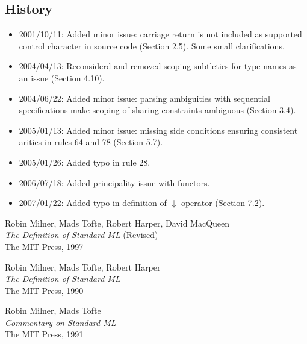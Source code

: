 \documentclass{article}
\begin{document}
\vfill
\pagebreak
\begin{appendix}

\section{History}
\label{history}

\begin{itemize} \setlength{\itemsep}{0em}
\item 2001/10/11: Added minor issue: carriage return is not included as supported control character in source code (Section 2.5). Some small clarifications.
\item 2004/04/13: Reconsiderd and removed scoping subtleties for type names as an issue (Section 4.10).
\item 2004/06/22: Added minor issue: parsing ambiguities with sequential specifications make scoping of sharing constraints ambiguous (Section 3.4).
\item 2005/01/13: Added minor issue: missing side conditions ensuring consistent arities in rules 64 and 78 (Section 5.7).
\item 2005/01/26: Added typo in rule 28.
\item 2006/07/18: Added principality issue with functors.
\item 2007/01/22: Added typo in definition of $\downarrow$ operator (Section 7.2).
\end{itemize}


\begin{thebibliography}{MTHM97}

Robin Milner, Mads Tofte, Robert Harper, David MacQueen \\
{\it The Definition of Standard ML} (Revised) \\
The MIT Press, 1997

Robin Milner, Mads Tofte, Robert Harper \\
{\it The Definition of Standard ML} \\
The MIT Press, 1990

Robin Milner, Mads Tofte \\
{\it Commentary on Standard ML} \\
The MIT Press, 1991


\end{thebibliography}
\end{appendix}
\end{document}
